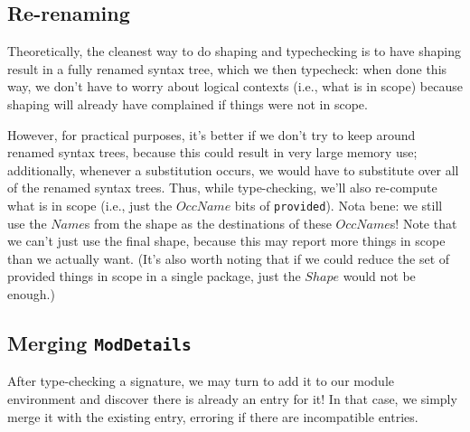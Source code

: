 \documentclass{article}
\newcommand{\I}[1]{\ensuremath{\mathit{#1}}}
\begin{document}
\subsection{Re-renaming}

Theoretically, the cleanest way to do shaping and typechecking is to have shaping
result in a fully renamed syntax tree, which we then typecheck: when done this way,
we don't have to worry about logical contexts (i.e., what is in scope) because
shaping will already have complained if things were not in scope.

However, for practical purposes, it's better if we don't try to keep
around renamed syntax trees, because this could result in very large
memory use; additionally, whenever a substitution occurs, we would have
to substitute over all of the renamed syntax trees.  Thus, while
type-checking, we'll also re-compute what is in scope (i.e.,  just the
\I{OccName} bits of \verb|provided|). Nota bene: we still use the
\I{Name}s from the shape as the destinations of these
\I{OccName}s!  Note that we can't just use the final shape, because
this may report more things in scope than we actually want.  (It's also
worth noting that if we could reduce the set of provided things in
scope in a single package, just the \I{Shape} would not be enough.)

\subsection{Merging \texttt{ModDetails}}

After type-checking a signature, we may turn to add it to our module
environment and discover there is already an entry for it!  In that case,
we simply merge it with the existing entry, erroring if there are incompatible
entries.
\end{document}
